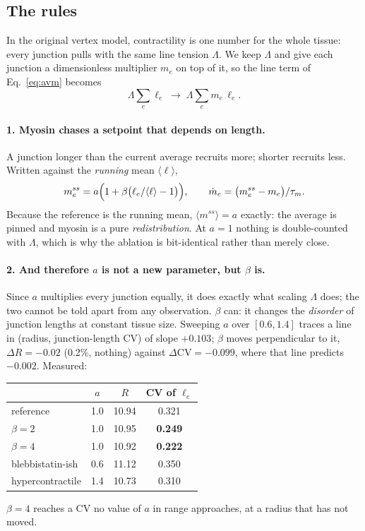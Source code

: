 \documentclass[10pt]{article}
\begin{document}
\subsection*{The rules}

In the original vertex model, contractility is one number for the whole tissue: every junction pulls
with the same line tension $\Lambda$. We keep $\Lambda$ and give each junction a dimensionless
multiplier $m_e$ on top of it, so the line term of Eq.~\eqref{eq:avm} becomes
\[ \Lambda\sum_e \ell_e \;\longrightarrow\; \Lambda\sum_e m_e\,\ell_e . \]

\paragraph{1. Myosin chases a setpoint that depends on length.} A junction longer than the current
average recruits more; shorter recruits less. Written against the \emph{running} mean $\langle\ell\rangle$,
\[ m^{ss}_e=a\Bigl(1+\beta\bigl(\ell_e/\langle\ell\rangle-1\bigr)\Bigr),\qquad
   \dot m_e=\bigl(m^{ss}_e-m_e\bigr)/\tau_m . \]
Because the reference is the running mean, $\langle m^{ss}\rangle=a$ exactly: the average is pinned and
myosin is a pure \emph{redistribution}. At $a=1$ nothing is double-counted with $\Lambda$, which is why
the ablation is bit-identical rather than merely close.

\paragraph{2. And therefore $a$ is not a new parameter, but $\beta$ is.} Since $a$ multiplies every
junction equally, it does exactly what scaling $\Lambda$ does; the two cannot be told apart from any
observation. $\beta$ can: it changes the \emph{disorder} of junction lengths at constant tissue size.
Sweeping $a$ over $[0.6,1.4]$ traces a line in (radius, junction-length CV) of slope $+0.103$; $\beta$
moves perpendicular to it, $\Delta R=-0.02$ (0.2\%, nothing) against $\Delta\mathrm{CV}=-0.099$, where
that line predicts $-0.002$. Measured:
\begin{center}\small
\begin{tabular}{lccc}\toprule
 & $a$ & $R$ & CV of $\ell_e$ \\ \midrule
reference        & 1.0 & 10.94 & 0.321 \\
$\beta=2$        & 1.0 & 10.95 & \textbf{0.249} \\
$\beta=4$        & 1.0 & 10.92 & \textbf{0.222} \\
blebbistatin-ish & 0.6 & 11.12 & 0.350 \\
hypercontractile & 1.4 & 10.73 & 0.310 \\ \bottomrule
\end{tabular}
\end{center}
$\beta=4$ reaches a CV no value of $a$ in range approaches, at a radius that has not moved.
\end{document}
